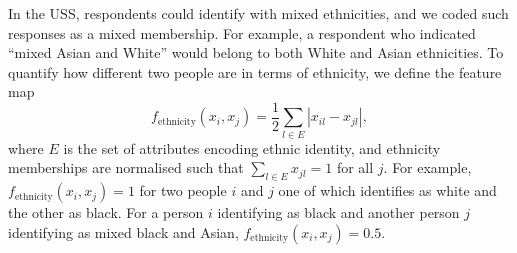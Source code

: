 \documentclass{scrartcl}
\newcommand{\abs}[1]{\left|#1\right|}
\begin{document}
\begin{refsection}
In the USS, respondents could identify with mixed ethnicities, and we coded such responses as a mixed membership. For example, a respondent who indicated ``mixed Asian and White'' would belong to both White and Asian ethnicities. To quantify how different two people are in terms of ethnicity, we define the feature map
\begin{equation*}
    f_\text{ethnicity}(x_i, x_j) = \frac{1}{2} \sum_{l\in E}\abs{x_{il}-x_{jl}},
\end{equation*}
where $E$ is the set of attributes encoding ethnic identity, and ethnicity memberships are normalised such that $\sum_{l\in E}x_{jl}=1$ for all $j$. For example, $f_\text{ethnicity}(x_i, x_j)=1$ for two people $i$ and $j$ one of which identifies as white and the other as black. For a person $i$ identifying as black and another person $j$ identifying as mixed black and Asian, $f_\text{ethnicity}(x_i, x_j)=0.5$.


\end{refsection}
\end{document}

